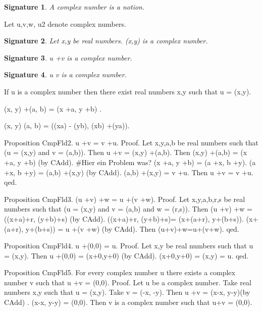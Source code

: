 \documentclass{article}
\newenvironment{forthel}{\begin{leftbar}}{\end{leftbar}}
\newtheorem{axiom}{\begin{axiom} }
\newtheorem{signature}{Signature}
\newcommand{\cmul}{\cdot}
\newcommand{\rmul}{\cdot}
\newcommand{\cadd}{+}
\newcommand{\radd}{+}
\begin{document}
\begin{forthel}
\begin{signature} A complex number is a notion.
\end{signature}
Let u,v,w, u2 denote complex numbers.
\begin{signature} Let x,y be real numbers. (x,y) is a complex number.
\end{signature}
\begin{signature} u \cadd  v is a complex number.
\end{signature}
\begin{signature} u \cmul  v is a complex number.
\end{signature}
\begin{axiom} If u is a complex number then there exist real numbers x,y such that u = (x,y).
\end{axiom}
\begin{axiom}  [CAdd] (x, y) \cadd  (a, b) = (x \radd  a, y \radd  b) .
\end{axiom}
\begin{axiom}  [CMult] (x, y) \cmul  (a, b) = ((x\rmul a) - (y\rmul b), (x\rmul b) \radd  (y\rmul a)).
\end{axiom}




Proposition CmpFld2.  u \cadd  v = v \cadd  u.
Proof. Let x,y,a,b be real numbers such that (u = (x,y) and v = (a,b)).
Then u \cadd  v = (x,y) \cadd  (a,b).
Then (x,y) \cadd  (a,b) = (x \radd  a, y \radd  b) (by CAdd).	#Hier ein Problem was?
	    (x \radd  a, y \radd  b) = (a \radd  x, b \radd  y). 
	    (a \radd  x, b \radd  y) = (a,b) \cadd  (x,y) (by CAdd).
	    (a,b) \cadd  (x,y) = v \cadd  u. 
Then u \cadd  v = v \cadd  u.
qed. 



Proposition CmpFld3. (u \cadd  v) \cadd  w = u \cadd  (v \cadd  w).
Proof. Let x,y,a,b,r,s be real numbers such that (u = (x,y) and v = (a,b) and w = (r,s)).
Then (u \cadd  v) \cadd  w = ((x\radd a)\radd r, (y\radd b)\radd s) (by CAdd). 
((x\radd a)\radd r, (y\radd b)\radd s)= (x\radd (a\radd r), y\radd (b\radd s)).
(x\radd (a\radd r), y\radd (b\radd s)) = u \cadd  (v \cadd  w) (by CAdd).
Then (u\cadd v)\cadd w=u\cadd (v\cadd w). 
qed.

Proposition CmpFld4. u \cadd  (0,0) = u.
Proof. 
	Let x,y be real numbers such that u = (x,y). Then u \cadd  (0,0) = (x\radd 0,y\radd 0) (by CAdd). (x\radd 0,y\radd 0) = (x,y) = u. 
qed.



Proposition CmpFld5. For every complex number u there exists a complex number v such that u \cadd  v = (0,0).
Proof. Let u be a complex number.
	Take real numbers x,y such that u = (x,y). Take v = (-x, -y). Then  u \cadd  v = (x-x, y-y)(by CAdd) . (x-x, y-y) = (0,0). 
	Then v is a complex number such that u\cadd v = (0,0).
	

\end{forthel}
\end{document}
